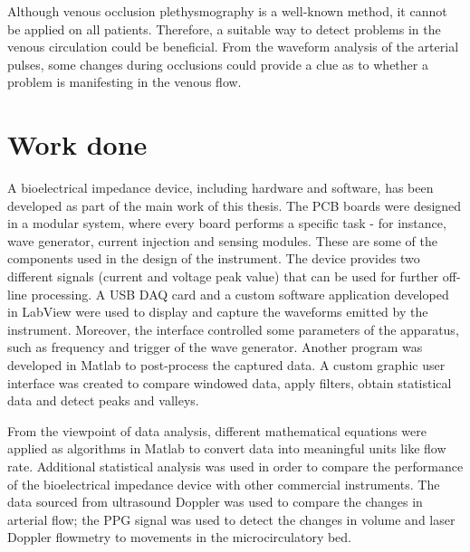 Although venous occlusion plethysmography is a well-known method, it cannot be applied on all patients. Therefore, a suitable way to detect problems in the venous circulation could be beneficial. From the waveform analysis of the arterial pulses, some changes during occlusions could provide a clue as to whether a problem is manifesting in the venous flow.

\section{Work done}
A bioelectrical impedance device, including hardware and software, has been developed as part of the main work of this thesis. The PCB boards were designed in a modular system, where every board performs a specific task - for instance, wave generator, current injection and sensing modules. These are some of the components used in the design of the instrument. The device provides two different signals (current and voltage peak value) that can be used for further off-line processing. A USB DAQ card and a custom software application developed in LabView \cite{LabView:2016} were used to display and capture the waveforms emitted by the instrument. Moreover, the interface controlled some parameters of the apparatus, such as frequency and trigger of the wave generator. Another program was developed in Matlab \cite{MATLAB:2016} to post-process the captured data. A custom graphic user interface was created to compare windowed data, apply filters, obtain statistical data and detect peaks and valleys.

From the viewpoint of data analysis, different mathematical equations were applied as algorithms in Matlab to convert data into meaningful units like flow rate. Additional statistical analysis was used in order to compare the performance of the bioelectrical impedance device with other commercial instruments. The data sourced from ultrasound Doppler was used to compare the changes in arterial flow; the PPG signal was used to detect the changes in volume and laser Doppler flowmetry to movements in the microcirculatory bed.


